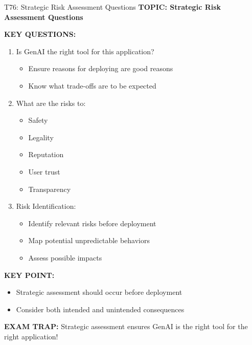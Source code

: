 \documentclass[8pt]{beamer}
\begin{document}
	\begin{frame}{T76: Strategic Risk Assessment Questions}
		\fontsize{6.5}{7.5}\selectfont
		\textbf{TOPIC: Strategic Risk Assessment Questions}
		
		\vspace{0.1cm}
		\textbf{KEY QUESTIONS:}
		\begin{enumerate}
			\item \textcolor{myblue}{Is GenAI the right tool for this application?}
			\begin{itemize}
				\item Ensure reasons for deploying are good reasons
				\item Know what trade-offs are to be expected
			\end{itemize}
			\item \textcolor{myblue}{What are the risks to:}
			\begin{itemize}
				\item Safety
				\item Legality
				\item Reputation
				\item User trust
				\item Transparency
			\end{itemize}
			\item \textcolor{myblue}{Risk Identification:}
			\begin{itemize}
				\item Identify relevant risks before deployment
				\item Map potential unpredictable behaviors
				\item Assess possible impacts
			\end{itemize}
		\end{enumerate}
		
		\vspace{0.1cm}
		\textbf{KEY POINT:}
		\begin{itemize}
			\item Strategic assessment should occur before deployment
			\item Consider both intended and unintended consequences
		\end{itemize}
		
		\textcolor{myred}{\textbf{EXAM TRAP:}} Strategic assessment ensures \textcolor{myblue}{GenAI is the right tool for the right application}!
	\end{frame}
	
\end{document}
